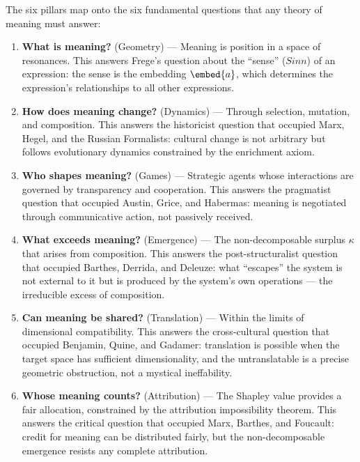 \begin{interpretation}
\label{interp:ch22:six_pillars_detailed}
The six pillars map onto the six fundamental questions that any theory
of meaning must answer:

\begin{enumerate}
\item \textbf{What is meaning?} (Geometry) --- Meaning is position in a
  space of resonances.  This answers Frege's question about the ``sense''
  ($Sinn$) of an expression: the sense is the embedding $\embed{a}$,
  which determines the expression's relationships to all other expressions.

\item \textbf{How does meaning change?} (Dynamics) --- Through selection,
  mutation, and composition.  This answers the historicist question that
  occupied Marx, Hegel, and the Russian Formalists: cultural change is
  not arbitrary but follows evolutionary dynamics constrained by the
  enrichment axiom.

\item \textbf{Who shapes meaning?} (Games) --- Strategic agents whose
  interactions are governed by transparency and cooperation.  This answers
  the pragmatist question that occupied Austin, Grice, and Habermas:
  meaning is negotiated through communicative action, not passively
  received.

\item \textbf{What exceeds meaning?} (Emergence) --- The non-decomposable
  surplus $\kappa$ that arises from composition.  This answers the
  post-structuralist question that occupied Barthes, Derrida, and Deleuze:
  what ``escapes'' the system is not external to it but is produced by
  the system's own operations --- the irreducible excess of composition.

\item \textbf{Can meaning be shared?} (Translation) --- Within the
  limits of dimensional compatibility.  This answers the
  cross-cultural question that occupied Benjamin, Quine, and Gadamer:
  translation is possible when the target space has sufficient
  dimensionality, and the untranslatable is a precise geometric
  obstruction, not a mystical ineffability.

\item \textbf{Whose meaning counts?} (Attribution) --- The Shapley value
  provides a fair allocation, constrained by the attribution impossibility
  theorem.  This answers the critical question that occupied Marx, Barthes,
  and Foucault: credit for meaning can be distributed fairly, but the
  non-decomposable emergence resists any complete attribution.
\end{enumerate}


\end{interpretation}
